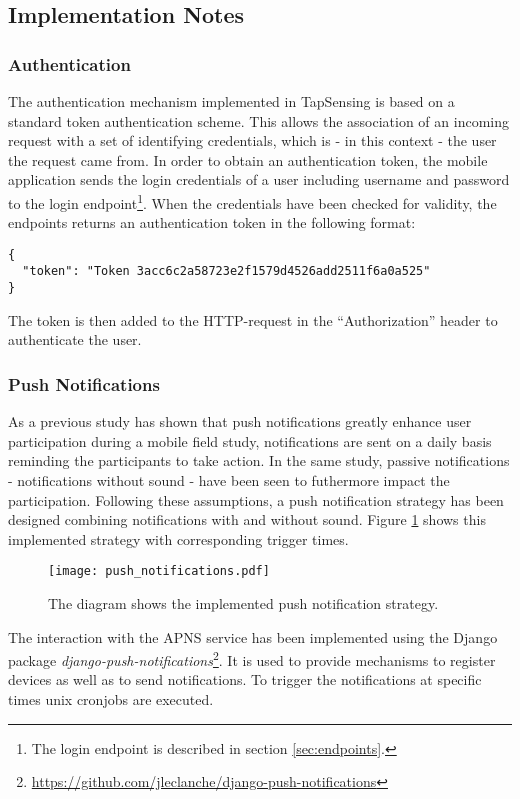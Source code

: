 \subsection{Implementation Notes}
\subsubsection{Authentication}
The authentication mechanism implemented in TapSensing is based on a standard token authentication scheme. This allows the association of an incoming request with a set of identifying credentials, which is - in this context - the user the request came from. In order to obtain an authentication token, the mobile application sends the login credentials of a user including username and password to the login endpoint\footnote{The login endpoint is described in section \ref{sec:endpoints}.}. When the credentials have been checked for validity, the endpoints returns an authentication token in the following format:
\begin{verbatim}
{
  "token": "Token 3acc6c2a58723e2f1579d4526add2511f6a0a525"
}
\end{verbatim}
The token is then added to the HTTP-request in the ``Authorization'' header to authenticate the user.

\subsubsection{Push Notifications}
As a previous study has shown that push notifications greatly enhance user participation \cite{pushNot} during a mobile field study, notifications are sent on a daily basis reminding the participants to take action. In the same study\cite{pushNot}, passive notifications - notifications without sound - have been seen to futhermore impact the participation. Following these assumptions, a push notification strategy has been designed combining notifications with and without sound. Figure \ref{fig:push-notifications} shows this implemented strategy with corresponding trigger times. \\

\begin{figure}[h!]
  \centering
  \texttt{[image: push\_notifications.pdf]}
  \caption{The diagram shows the implemented push notification strategy.} \label{fig:push-notifications}
\end{figure}

The interaction with the APNS service has been implemented using the Django package \textit{django-push-notifications}\footnote{\url{https://github.com/jleclanche/django-push-notifications}}. It is used to provide mechanisms to register devices as well as to send notifications. To trigger the notifications at specific times unix cronjobs are executed.
